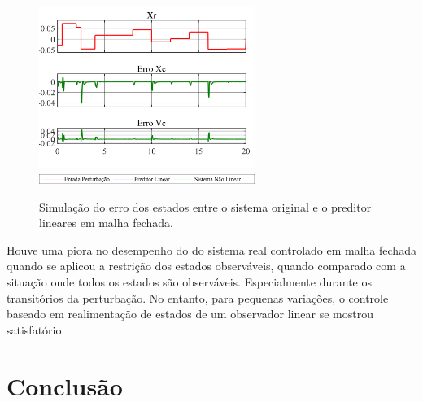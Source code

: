 \documentclass[a4paper]{ifacconf}
\begin{document}
    \FloatBarrier
    \begin{figure}[htbp]
        \begin{centering}
            \includegraphics[width=7cm]{img/simulaca_temporal_preditor_linear_erro.png}
            \includegraphics[width=7cm]{img/simulaca_temporal_preditor_linear_erro_leg.png}
            \caption{Simulação do erro dos estados entre o sistema original e o preditor lineares em malha fechada.}
            \label{fig:simulaca_temporal_preditor_linear_erro}
        \end{centering}
    \end{figure}
    \FloatBarrier

    Houve uma piora no desempenho do do sistema real controlado em malha fechada quando se aplicou a restrição dos estados observáveis, quando comparado com a situação onde todos os estados são observáveis. Especialmente durante os transitórios da perturbação. No entanto, para pequenas variações, o controle baseado em realimentação de estados de um observador linear se mostrou satisfatório.
    
    \section{Conclusão}
\end{document}
